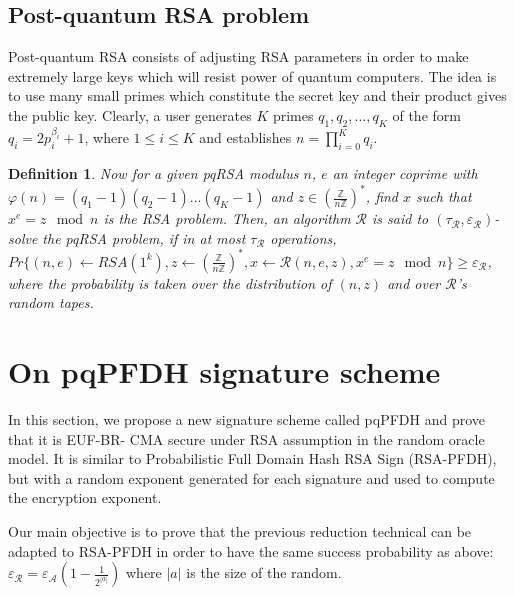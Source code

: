 \documentclass[a4paper,11pt]{article}
\newtheorem{definition}[theorem]{Definition}
\begin{document}
\subsection{Post-quantum RSA problem}\label{sec:one:3}
Post-quantum RSA consists of adjusting RSA parameters in order to make extremely large keys which will resist power of quantum computers. The idea is to use many small primes which constitute the secret key and their product gives the public key. Clearly, a user generates $K$ primes $q_1,q_2,...,q_K$ of the form $q_i=2p_i^{\beta_i}+1$, where $ 1\leq i\leq K$ and establishes $n=\prod_{i=0}^{K}{q_i}$.\\
\begin{definition}
Now for a given pqRSA modulus  $n$, $e$ an integer coprime with $\varphi (n)=(q_1-1)(q_2-1)...(q_K-1)$ and $z \in (\frac{\mathbb{Z}}{n\mathbb{Z}})^{*}$, find $x$ such that $x^{e} = z  \mod n$ is the RSA problem. Then, an algorithm $\mathcal{R}$ is said to $(\tau_{\mathcal{R}} , \varepsilon_{\mathcal{R}} )$-solve the pqRSA
problem, if in at most $\tau_{\mathcal{R}}$ operations, $Pr \lbrace (n,e) \leftarrow RSA(1^{k} ), z \leftarrow (\frac{\mathbb{Z}}{n\mathbb{Z}})^{*} , x \leftarrow \mathcal{R}(n, e, z), x^{e} = z \mod n\rbrace \geq \varepsilon_{\mathcal{R}} $, where the probability is taken over the distribution of $(n, z)$ and over $\mathcal{\mathcal{R}}$'s  random tapes.
\end{definition}

\section{On pqPFDH signature scheme}\label{sec:three}

In this section,  we propose a new signature scheme called pqPFDH and prove that it is EUF-BR- CMA secure under RSA
assumption  in the random oracle model. It is similar to Probabilistic Full Domain Hash RSA Sign (RSA-PFDH), but with a random exponent generated for each signature and used to compute the encryption exponent.

Our main objective is to prove that the previous reduction technical can be adapted to RSA-PFDH  in order to have the same success probability as above: $\varepsilon_{\mathcal{R}} = \varepsilon_{\mathcal{A}}(1-\frac{1}{2^{|a|}}) $ where $|a|$ is the size of the random.

\end{document}
